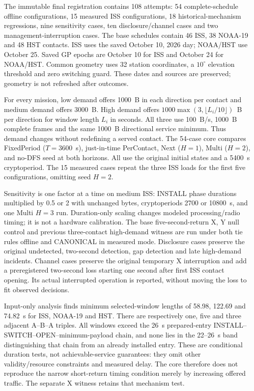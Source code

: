 \documentclass[conference]{IEEEtran}
\begin{document}
The immutable final registration contains 108 attempts: 54 complete-schedule offline configurations, 15 measured ISS configurations, 18 historical-mechanism regressions, nine sensitivity cases, ten disclosure/channel cases and two management-interruption cases. The base schedules contain 46 ISS, 38 NOAA-19 and 48 HST contacts. ISS uses the saved October 10, 2026 day; NOAA/HST use October 25. Saved GP epochs are October 10 for ISS and October 24 for NOAA/HST. Common geometry uses 32 station coordinates, a $10^{\circ}$ elevation threshold and zero switching guard. These dates and sources are preserved; geometry is not refreshed after outcomes.

For every mission, low demand offers 1000~B in each direction per contact and medium demand offers 3000~B. High demand offers $1000\max(3,\lfloor L_i/10\rfloor)$~B per direction for window length $L_i$ in seconds. All three use 100~B/s, 1000~B complete frames and the same 1000~B directional service minimum. Thus demand changes without redefining a served contact. The 54-case core compares FixedPeriod ($T=3600$~s), just-in-time PerContact, Next ($H=1$), Multi ($H=2$), and no-DFS seed at both horizons. All use the original initial states and a 5400~s cryptoperiod. The 15 measured cases repeat the three ISS loads for the first five configurations, omitting seed $H=2$.

Sensitivity is one factor at a time on medium ISS: INSTALL phase durations multiplied by 0.5 or 2 with unchanged bytes, cryptoperiods 2700 or 10800~s, and one Multi $H=3$ run. Duration-only scaling changes modeled processing/radio timing; it is not a hardware calibration. The base five-second-return X, Y null control and previous three-contact high-demand witness are run under both tie rules offline and CANONICAL in measured mode. Disclosure cases preserve the original undetected, two-second detection, gap detection and late high-demand incidents. Channel cases preserve the original temporary X interruption and add a preregistered two-second loss starting one second after first ISS contact opening. Its actual interrupted operation is reported, without moving the loss to fit observed decisions.

Input-only analysis finds minimum selected-window lengths of 58.98, 122.69 and 74.82~s for ISS, NOAA-19 and HST. There are respectively one, five and three adjacent A--B--A triples. All windows exceed the 26~s prepared-entry INSTALL--SWITCH--OPEN--minimum-payload chain, and none lies in the 22--26~s band distinguishing that chain from an already installed entry. These are conditional duration tests, not achievable-service guarantees: they omit other validity/resource constraints and measured delay. The core therefore does not reproduce the narrow short-return timing condition merely by increasing offered traffic. The separate X witness retains that mechanism test.
\end{document}
